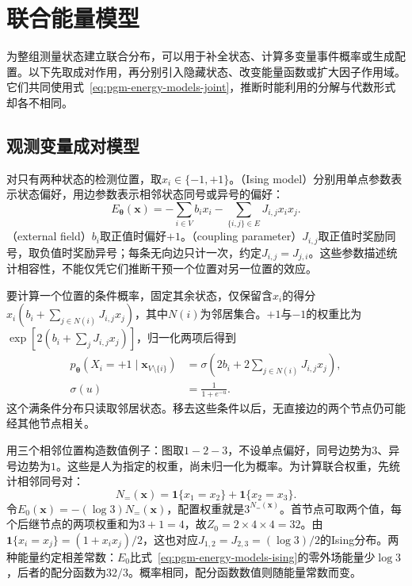 \section{联合能量模型}
\label{sec:pgm-energy-models-joint-models}

为整组测量状态建立联合分布，可以用于补全状态、计算多变量事件概率或生成配置。以下先取成对作用，再分别引入隐藏状态、改变能量函数或扩大因子作用域。它们共同使用式~\eqref{eq:pgm-energy-models-joint}，推断时能利用的分解与代数形式却各不相同。

\subsection{观测变量成对模型}
\label{sec:pgm-energy-models-pairwise}

对只有两种状态的检测位置，取$x_i\in\{-1,+1\}$。（Ising model）分别用单点参数表示状态偏好，用边参数表示相邻状态同号或异号的偏好：
\begin{equation}
  E_{\bm{\theta}}(\bm{x})
    =-\sum_{i\in V}b_ix_i
     -\sum_{\{i,j\}\in E}J_{i,j}x_ix_j.
  \label{eq:pgm-energy-models-ising}
\end{equation}
（external field）$b_i$取正值时偏好$+1$。（coupling parameter）$J_{i,j}$取正值时奖励同号，取负值时奖励异号；每条无向边只计一次，约定$J_{i,j}=J_{j,i}$。这些参数描述统计相容性，不能仅凭它们推断干预一个位置对另一位置的效应。

要计算一个位置的条件概率，固定其余状态，仅保留含$x_i$的得分$x_i(b_i+\sum_{j\in N(i)}J_{i,j}x_j)$，其中$N(i)$为邻居集合。$+1$与$-1$的权重比为$\exp[2(b_i+\sum_jJ_{i,j}x_j)]$，归一化两项后得到
\begin{equation}
  \begin{aligned}
    p_{\bm{\theta}}(X_i=+1\mid\bm{x}_{V\setminus\{i\}})
      &=\sigma\!\left(2b_i+
           2\sum_{j\in N(i)}J_{i,j}x_j\right),\\
    \sigma(u)&=\frac{1}{1+e^{-u}}.
  \end{aligned}
  \label{eq:pgm-energy-models-ising-conditional}
\end{equation}
这个满条件分布只读取邻居状态。移去这些条件以后，无直接边的两个节点仍可能经其他节点相关。

用三个相邻位置构造数值例子：图取$1-2-3$，不设单点偏好，同号边势为$3$、异号边势为$1$。这些是人为指定的权重，尚未归一化为概率。为计算联合权重，先统计相邻同号对：
\[
  N_{=}(\bm{x})
   =\mathbf{1}\{x_1=x_2\}+\mathbf{1}\{x_2=x_3\}.
\]
令$E_0(\bm{x})=-(\log3)N_{=}(\bm{x})$，配置权重就是$3^{N_{=}(\bm{x})}$。首节点可取两个值，每个后继节点的两项权重和为$3+1=4$，故$Z_0=2\times4\times4=32$。由$\mathbf{1}\{x_i=x_j\}=(1+x_ix_j)/2$，这也对应$J_{1,2}=J_{2,3}=(\log3)/2$的Ising分布。两种能量约定相差常数：$E_0$比式~\eqref{eq:pgm-energy-models-ising}的零外场能量少$\log3$，后者的配分函数为$32/3$。概率相同，配分函数数值则随能量常数而变。

